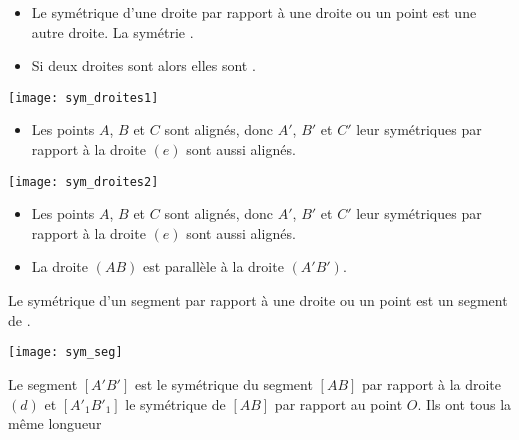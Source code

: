 \begin{myprops}
	\begin{itemize}
		\item Le symétrique d'une droite par rapport à une droite ou un point est une autre droite. La symétrie .
		\item Si deux droites sont  alors elles sont .
	\end{itemize}
\end{myprops}

\begin{myexs}
	\begin{multicols}{2}
		\begin{center}
			\texttt{[image: sym\_droites1]}
		\end{center}

		\begin{itemize}
			\item Les points $A$, $B$ et $C$ sont alignés, donc $A'$, $B'$ et $C'$ leur symétriques par rapport à la droite $(e)$ sont aussi alignés.
		\end{itemize}	
		
		\begin{center}
			\texttt{[image: sym\_droites2]}
		\end{center}
	
		\begin{itemize}
			\item Les points $A$, $B$ et $C$ sont alignés, donc $A'$, $B'$ et $C'$ leur symétriques par rapport à la droite $(e)$ sont aussi alignés.
			\item La droite $(AB)$ est parallèle à la droite $(A'B')$.
		\end{itemize}
	\end{multicols}
\end{myexs}

\begin{myprop}
	Le symétrique d'un segment par rapport à une droite ou un point est un segment de . 
\end{myprop}

\begin{myex}
	\begin{center}
		\texttt{[image: sym\_seg]}
	\end{center}

Le segment $[A'B']$ est le symétrique du segment $[AB]$ par rapport à la droite $(d)$ et $[A'_1B'_1]$ le symétrique de $[AB]$ par rapport au point $O$. 
Ils ont tous la même longueur

	
\end{myex}

